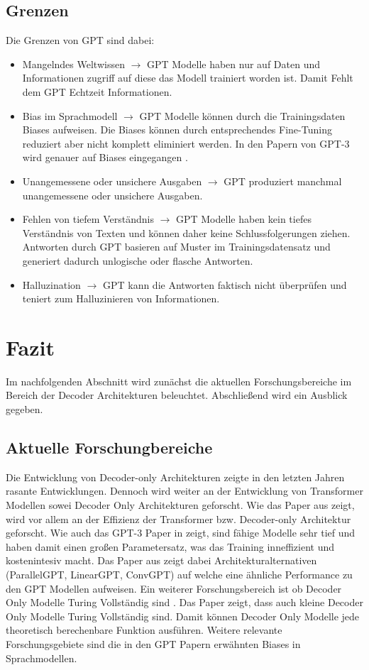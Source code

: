 \documentclass[conference]{IEEEtran}
\begin{document}
\subsection{Grenzen}
Die Grenzen von GPT sind dabei:
\begin{itemize}
    \item Mangelndes Weltwissen $\rightarrow$ GPT Modelle haben nur auf Daten und Informationen zugriff auf diese das Modell trainiert worden ist. Damit Fehlt dem GPT Echtzeit Informationen.
    \item Bias im Sprachmodell $\rightarrow$ GPT Modelle können durch die Trainingsdaten Biases aufweisen. Die Biases können durch entsprechendes Fine-Tuning reduziert aber nicht komplett eliminiert werden. In den Papern von GPT-3 wird genauer auf Biases eingegangen \cite{brownLanguageModelsAre2020}.
    \item Unangemessene oder unsichere Ausgaben $\rightarrow$ GPT produziert manchmal unangemessene oder unsichere Ausgaben.
    \item Fehlen von tiefem Verständnis $\rightarrow$ GPT Modelle haben kein tiefes Verständnis von Texten und können daher keine Schlussfolgerungen ziehen. Antworten durch GPT basieren auf Muster im Trainingsdatensatz und generiert dadurch unlogische oder flasche Antworten.
    \item Halluzination $\rightarrow$ GPT kann die Antworten faktisch nicht überprüfen und teniert zum Halluzinieren von Informationen.
\end{itemize}

\section{Fazit}
Im nachfolgenden Abschnitt wird zunächst die aktuellen Forschungsbereiche im Bereich der Decoder Architekturen beleuchtet. Abschließend wird ein Ausblick gegeben.
\subsection{Aktuelle Forschungbereiche}
Die Entwicklung von Decoder-only Architekturen zeigte in den letzten Jahren rasante Entwicklungen.
Dennoch wird weiter an der Entwicklung von Transformer Modellen sowei Decoder Only Architekturen geforscht. Wie das Paper aus \cite{sureshSmallerFasterDecoderonly2024} zeigt, wird vor allem an der Effizienz der Transformer bzw. Decoder-only Architektur geforscht. Wie auch das GPT-3 Paper in \cite{brownLanguageModelsAre2020} zeigt, sind fähige Modelle sehr tief und haben damit einen großen Parametersatz, was das Training inneffizient und kostenintesiv macht. Das Paper aus \cite{sureshSmallerFasterDecoderonly2024} zeigt dabei Architekturalternativen (ParallelGPT, LinearGPT, ConvGPT) auf welche eine ähnliche Performance zu den GPT Modellen aufweisen.
Ein weiterer Forschungsbereich ist ob Decoder Only Modelle Turing Vollständig sind \cite{robertsHowPowerfulAre2024}. Das Paper zeigt, dass auch kleine Decoder Only Modelle Turing Vollständig sind. Damit können Decoder Only Modelle jede theoretisch berechenbare Funktion ausführen.
Weitere relevante Forschungsgebiete sind die in den GPT Papern erwähnten Biases in Sprachmodellen.
\end{document}
